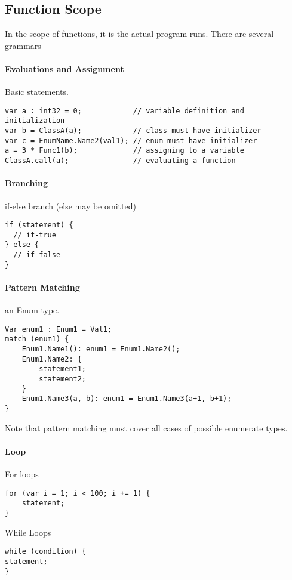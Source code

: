 \documentclass[12pt, a4paper]{IEEEtran}
\begin{document}
\subsection{Function Scope}
In the scope of functions, it is the actual program runs. There are several grammars
\paragraph{Evaluations and Assignment}
Basic statements.
\begin{lstlisting}
var a : int32 = 0;            // variable definition and initialization
var b = ClassA(a);            // class must have initializer
var c = EnumName.Name2(val1); // enum must have initializer
a = 3 * Func1(b);             // assigning to a variable
ClassA.call(a);               // evaluating a function
\end{lstlisting}
\paragraph{Branching}
if-else branch (else may be omitted)
\begin{lstlisting}
if (statement) {
  // if-true
} else {
  // if-false
}
\end{lstlisting}
\paragraph{Pattern Matching}
an Enum type.
\begin{lstlisting}
Var enum1 : Enum1 = Val1;
match (enum1) {
	Enum1.Name1(): enum1 = Enum1.Name2();
	Enum1.Name2: {
		statement1;
		statement2;
	}
	Enum1.Name3(a, b): enum1 = Enum1.Name3(a+1, b+1);
}
\end{lstlisting}
Note that pattern matching must cover all cases of possible enumerate types.
\paragraph{Loop} 
For loops
\begin{lstlisting}
for (var i = 1; i < 100; i += 1) {
	statement;
}
\end{lstlisting}
While Loops
\begin{lstlisting}
while (condition) {
statement;
}
\end{lstlisting}
\end{document}
